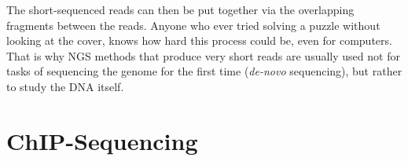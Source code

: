 \documentclass[parskip]{cs4rep}
\begin{document}
The short-sequenced reads can then be put together via the overlapping fragments between the reads. Anyone who ever tried solving a puzzle without looking at the cover, knows how hard this process could be, even for computers. That is why NGS methods that produce very short reads are usually used not for tasks of sequencing the genome for the first time (\emph{de-novo} sequencing), but
rather to study the DNA itself.

\section{ChIP-Sequencing}
\label{sec:chip}

\begin{figure}
\centering
{}

\end{figure}
\end{document}
